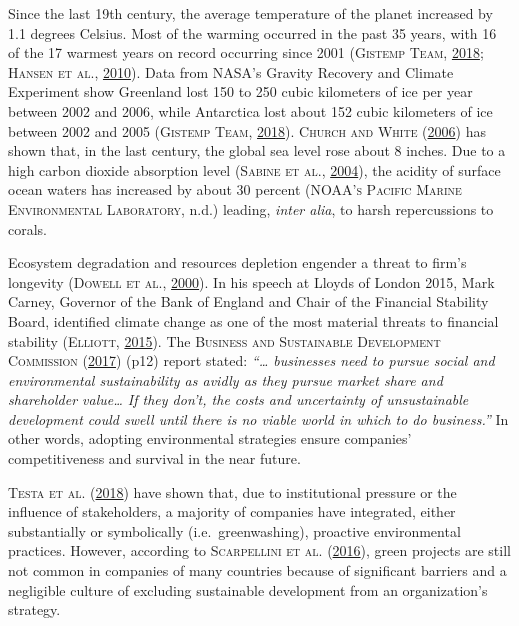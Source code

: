 \documentclass[12pt,]{article}
\begin{document}
Since the last 19th century, the average temperature of the planet
increased by 1.1 degrees Celsius. Most of the warming occurred in the
past 35 years, with 16 of the 17 warmest years on record occurring since
2001 (\textsc{Gistemp Team},
\protect\hyperlink{ref-GistempTeam2018}{2018}; \textsc{Hansen et al.},
\protect\hyperlink{ref-Hansen2010}{2010}). Data from NASA's Gravity
Recovery and Climate Experiment show Greenland lost 150 to 250 cubic
kilometers of ice per year between 2002 and 2006, while Antarctica lost
about 152 cubic kilometers of ice between 2002 and 2005 (\textsc{Gistemp
Team}, \protect\hyperlink{ref-GistempTeam2018}{2018}). \textsc{Church
and White} (\protect\hyperlink{ref-Church2006}{2006}) has shown that, in
the last century, the global sea level rose about 8 inches. Due to a
high carbon dioxide absorption level (\textsc{Sabine et al.},
\protect\hyperlink{ref-Sabine2004}{2004}), the acidity of surface ocean
waters has increased by about 30 percent (\textsc{NOAA's Pacific Marine
Environmental Laboratory}, n.d.) leading, \emph{inter alia}, to harsh
repercussions to corals.

Ecosystem degradation and resources depletion engender a threat to
firm's longevity (\textsc{Dowell et al.},
\protect\hyperlink{ref-Dowell2000}{2000}). In his speech at Lloyds of
London 2015, Mark Carney, Governor of the Bank of England and Chair of
the Financial Stability Board, identified climate change as one of the
most material threats to financial stability (\textsc{Elliott},
\protect\hyperlink{ref-Elliott2015}{2015}). The \textsc{Business and
Sustainable Development Commission}
(\protect\hyperlink{ref-BusinessandSustainableDevelopmentCommission2017}{2017})
(p12) report stated: \emph{``\ldots{} businesses need to pursue social
and environmental sustainability as avidly as they pursue market share
and shareholder value\ldots{} If they don't, the costs and uncertainty
of unsustainable development could swell until there is no viable world
in which to do business.''} In other words, adopting environmental
strategies ensure companies' competitiveness and survival in the near
future.

\textsc{Testa et al.} (\protect\hyperlink{ref-Testa2018}{2018}) have
shown that, due to institutional pressure or the influence of
stakeholders, a majority of companies have integrated, either
substantially or symbolically (i.e.~greenwashing), proactive
environmental practices. However, according to \textsc{Scarpellini et
al.}
(\protect\hyperlink{ref-Scarpellinieconomicfinanceinterface2016}{2016}),
green projects are still not common in companies of many countries
because of significant barriers and a negligible culture of excluding
sustainable development from an organization's strategy.
\end{document}
